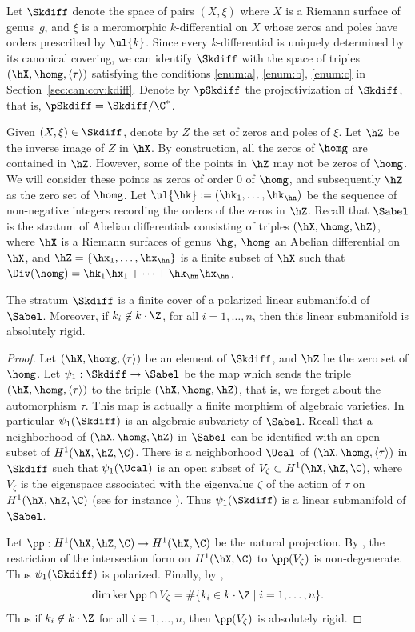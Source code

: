Let $\Skdiff$ denote the space of pairs $(X,\xi)$ where $X$ is a Riemann surface of genus~$g$, and $\xi$ is a meromorphic $k$-differential on $X$ whose zeros and poles have orders prescribed by $\ul{k}$.
Since every $k$-differential is uniquely determined by its canonical covering, we can identify $\Skdiff$ with the space of triples $(\hX,\homg,\langle\tau\rangle)$ satisfying the conditions \eqref{enum:a}, \eqref{enum:b}, \eqref{enum:c} in Section~\ref{sec:can:cov:kdiff}.
Denote by $\pSkdiff$ the projectivization of $\Skdiff$, that is, $\pSkdiff=\Skdiff/\C^*$.

Given $(X,\xi)\in \Skdiff$, denote by $Z$ the set of zeros and poles of $\xi$. Let $\hZ$ be the inverse image of $Z$ in $\hX$. By construction, all the zeros of $\homg$ are contained in $\hZ$.
However, some of the points in $\hZ$ may not be zeros of $\homg$. We will consider these points as zeros of order $0$ of $\homg$, and subsequently $\hZ$ as the zero set of $\homg$.
Let $\ul{\hk}:=(\hk_1,\dots,\hk_{\hn})$ be the sequence of non-negative integers recording the orders of the zeros in $\hZ$.
Recall that $\Sabel$ is the stratum of Abelian differentials consisting of triples $(\hX,\homg,\hZ)$, where $\hX$ is a Riemann surfaces of genus $\hg$, $\homg$ an Abelian differential on $\hX$, and $\hZ=\{\hx_1,\dots,\hx_{\hn}\}$ is a finite subset of $\hX$ such that $\Div(\homg)=\hk_1\hx_1+\dots+\hk_{\hn}\hx_{\hn}$.

\begin{Proposition}\label{prop:kdiff:ln:man}
The stratum $\Skdiff$ is a finite cover of a polarized linear submanifold of $\Sabel$. Moreover, if $k_i\not\in k\cdot\Z$, for all $i=1,\dots,n$, then this linear submanifold is absolutely rigid.
\end{Proposition}
\begin{proof}
Let $(\hX,\homg,\langle\tau\rangle)$ be an element of $\Skdiff$, and $\hZ$ be the zero set of $\homg$. Let $\psi_1: \Skdiff \to \Sabel$ be the map which sends the triple $(\hX,\homg,\langle \tau \rangle)$ to the triple $(\hX,\homg,\hZ)$, that is, we forget about the automorphism $\tau$. This map is actually a finite morphism of algebraic varieties. In particular $\psi_1(\Skdiff)$ is an algebraic subvariety of $\Sabel$.
Recall that a neighborhood of $(\hX,\homg,\hZ)$ in $\Sabel$ can be identified with an open subset of $H^1(\hX,\hZ,\C)$.
There is a neighborhood $\Ucal$ of $(\hX,\homg,\langle\tau\rangle)$ in $\Skdiff$ such that $\psi_1(\Ucal)$ is an open subset of $V_\zeta \subset H^1(\hX,\hZ,\C)$, where $V_\zeta$ is the eigenspace associated with the eigenvalue $\zeta$ of the action of $\tau$ on $H^1(\hX,\hZ,\C)$ (see for instance \cite{BCGGM:kdiff, Ngu19}). Thus $\psi_1(\Skdiff)$ is a linear submanifold of $\Sabel$.

Let $\pp: H^1(\hX,\hZ,\C) \to H^1(\hX,\C)$ be the natural projection. By \cite[Prop.\,5.1]{Ngu19}, the restriction of the intersection form on $H^1(\hX,\C)$ to $\pp(V_\zeta)$ is non-degenerate. Thus $\psi_1(\Skdiff)$ is polarized. Finally, by \cite[Prop.\,4.1]{Ngu19},
\[
\dim \ker\pp\cap V_\zeta = \#\{k_i\in k\cdot\Z\mid i=1,\dots,n\}.
\]
Thus if $k_i\not\in k\cdot\Z$ for all $i=1,\dots,n$, then $\pp(V_\zeta)$ is absolutely rigid.
\end{proof}

